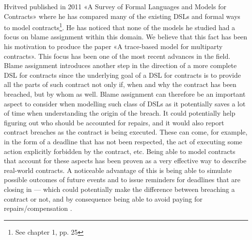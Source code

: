 \documentclass{ituthesis}
\begin{document}
Hvitved published in 2011 «A Survey of Formal Languages and Models for Contracts» where he has compared many of the existing DSLs and formal ways to model contracts\footnote{See \cite{hvitved2011contract} chapter 1, pp. 25}. He has noticed that none of the models he studied had a focus on blame assignment within this domain. We believe that this fact has been his motivation to produce the paper «A trace-based model for multiparty contracts». This focus has been one of the most recent advances in the field. Blame assignment introduces another step in the direction of a more complete DSL for contracts since the underlying goal of a DSL for contracts is to provide all the parts of such contract not only if, when and why the contract has been breached, but by whom as well. Blame assignment can therefore be an important aspect to consider when modelling such class of DSLs as it potentially saves a lot of time when understanding the origin of the breach. It could potentially help figuring out who should be accounted for repairs, and it would also report contract breaches as the contract is being executed. These can come, for example, in the form of a deadline that has not been respected, the act of executing some action explicitly forbidden by the contract, etc. Being able to model contracts that account for these aspects has been proven as a very effective way to describe real-world contracts. A noticeable advantage of this is being able to simulate possible outcomes of future events and to issue reminders for deadlines that are closing in --- which could potentially make the difference between breaching a contract or not, and by consequence being able to avoid paying for repairs/compensation \cite{hvitved2012trace}.
\end{document}
